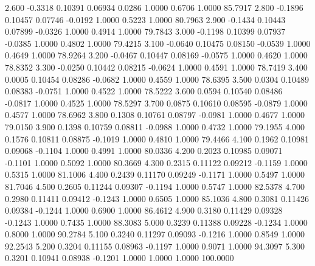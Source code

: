    2.600  -0.3318   0.10391   0.06934   0.0286   1.0000   0.6706   1.0000  85.7917
   2.800  -0.1896   0.10457   0.07746  -0.0192   1.0000   0.5223   1.0000  80.7963
   2.900  -0.1434   0.10443   0.07899  -0.0326   1.0000   0.4914   1.0000  79.7843
   3.000  -0.1198   0.10399   0.07937  -0.0385   1.0000   0.4802   1.0000  79.4215
   3.100  -0.0640   0.10475   0.08150  -0.0539   1.0000   0.4649   1.0000  78.9264
   3.200  -0.0467   0.10447   0.08169  -0.0575   1.0000   0.4620   1.0000  78.8352
   3.300  -0.0250   0.10442   0.08215  -0.0624   1.0000   0.4591   1.0000  78.7419
   3.400   0.0005   0.10454   0.08286  -0.0682   1.0000   0.4559   1.0000  78.6395
   3.500   0.0304   0.10489   0.08383  -0.0751   1.0000   0.4522   1.0000  78.5222
   3.600   0.0594   0.10540   0.08486  -0.0817   1.0000   0.4525   1.0000  78.5297
   3.700   0.0875   0.10610   0.08595  -0.0879   1.0000   0.4577   1.0000  78.6962
   3.800   0.1308   0.10761   0.08797  -0.0981   1.0000   0.4677   1.0000  79.0150
   3.900   0.1398   0.10759   0.08811  -0.0988   1.0000   0.4732   1.0000  79.1955
   4.000   0.1576   0.10811   0.08875  -0.1019   1.0000   0.4810   1.0000  79.4466
   4.100   0.1962   0.10981   0.09068  -0.1104   1.0000   0.4991   1.0000  80.0336
   4.200   0.2023   0.10985   0.09071  -0.1101   1.0000   0.5092   1.0000  80.3669
   4.300   0.2315   0.11122   0.09212  -0.1159   1.0000   0.5315   1.0000  81.1006
   4.400   0.2439   0.11170   0.09249  -0.1171   1.0000   0.5497   1.0000  81.7046
   4.500   0.2605   0.11244   0.09307  -0.1194   1.0000   0.5747   1.0000  82.5378
   4.700   0.2980   0.11411   0.09412  -0.1243   1.0000   0.6505   1.0000  85.1036
   4.800   0.3081   0.11426   0.09384  -0.1244   1.0000   0.6900   1.0000  86.4612
   4.900   0.3180   0.11429   0.09328  -0.1243   1.0000   0.7435   1.0000  88.3083
   5.000   0.3239   0.11388   0.09228  -0.1234   1.0000   0.8000   1.0000  90.2784
   5.100   0.3240   0.11297   0.09093  -0.1216   1.0000   0.8549   1.0000  92.2543
   5.200   0.3204   0.11155   0.08963  -0.1197   1.0000   0.9071   1.0000  94.3097
   5.300   0.3201   0.10941   0.08938  -0.1201   1.0000   1.0000   1.0000 100.0000
